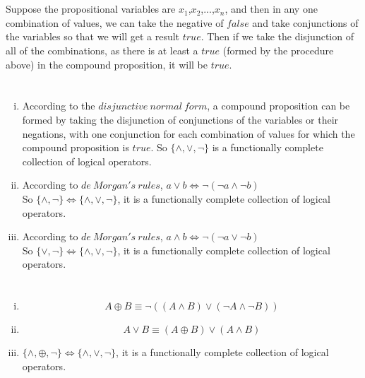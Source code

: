 \documentclass{article}
\begin{document}
\section{}

Suppose the propositional variables are $x_1$,$x_2$,...,$x_n$, and then in any one combination of values, we can take the negative of $false$ and take conjunctions of the variables so that we will get a result $true$. Then if we take the disjunction of all of the combinations, as there is at least a $true$ (formed by the procedure above) in the compound proposition, it will be $true$.

\section{}
\begin{enumerate}[i)]
\item
According to the $disjunctive\ normal\ form$, a compound proposition can be formed by taking the disjunction of conjunctions of the variables or their negations, with one conjunction for each combination of values for which the compound proposition is $true$. So $\{\land,\lor,\lnot\}$ is a functionally complete collection of logical operators. 

\item
According to $de\ Morgan's\ rules$, $a\lor b\Leftrightarrow\lnot(\lnot a\land\lnot b)$\\
So $\{\land,\lnot\}\Leftrightarrow\{\land,\lor,\lnot\}$, it is a functionally complete collection of logical operators. 

\item
According to $de\ Morgan's\ rules$, $a\land b\Leftrightarrow\lnot(\lnot a\lor\lnot b)$\\
So $\{\lor,\lnot\}\Leftrightarrow\{\land,\lor,\lnot\}$, it is a functionally complete collection of logical operators. 

\end{enumerate}

\section{}
\begin{enumerate}[i)]
\item
$$A\oplus B\equiv\lnot((A\land B)\lor(\lnot A\land\lnot B))$$
\item
$$A\lor B\equiv(A\oplus B)\lor(A\land B)$$
\item
$\{\land,\oplus,\lnot\}\Leftrightarrow\{\land,\lor,\lnot\}$, it is a functionally complete collection of logical operators. 
\end{enumerate}
\end{document}
